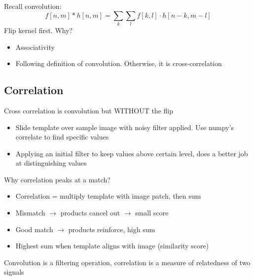 Recall convolution:
\[f[n,m]*h[n,m] = \sum_k\sum_l f[k,l]\cdot h[n-k,m-l]\]
Flip kernel first. Why?
\begin{itemize}
    \item Associativity
    \item Following definition of convolution. Otherwise, it is cross-correlation
\end{itemize}
\subsection{Correlation}
Cross correlation is convolution but WITHOUT the flip
\begin{itemize}
    \item Slide template over sample image with noisy filter applied. Use numpy's correlate to find specific values
    \item Applying an initial filter to keep values above certain level, does a better job at distinguishing values
\end{itemize}
Why correlation peaks at a match?
\begin{itemize}
    \item Correlation = multiply template with image patch, then sum
    \item Mismatch $\to$ products cancel out $\to$ small score
    \item Good match $\to$ products reinforce, high sum
    \item Highest sum when template aligns with image (similarity score)
\end{itemize}
Convolution is a filtering operation, correlation is a measure of relatedness of two signals\vspace{0.15in}\\
